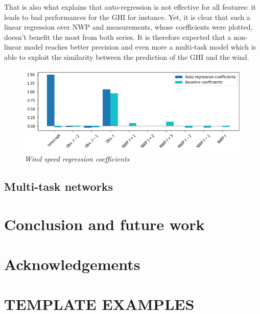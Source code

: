 \documentclass{article}
\newcommand{\saut}{\vspace{10px}}
\begin{document}
\saut

That is also what explains that auto-regression is not effective for all features: it leads to bad performances for the GHI
for instance. Yet, it is clear that such a linear regression over NWP and measurements, whose coefficients were
plotted, doesn't benefit the most from both series. It is therefore expected that a non-linear model reaches
better precision and even more a multi-task model which is able to exploit the similarity between the prediction of
the GHI and the wind.


\begin{figure}[H]
    \centering
    \includegraphics[width=\linewidth]{img/coef.png}
    \caption{\textit{Wind speed regression coefficients}}
    \label{fig:Fig. 6}
\end{figure}

\subsection*{Multi-task networks}

\section*{Conclusion and future work}

\section*{Acknowledgements}




\newpage

\section*{TEMPLATE EXAMPLES}
\end{document}
